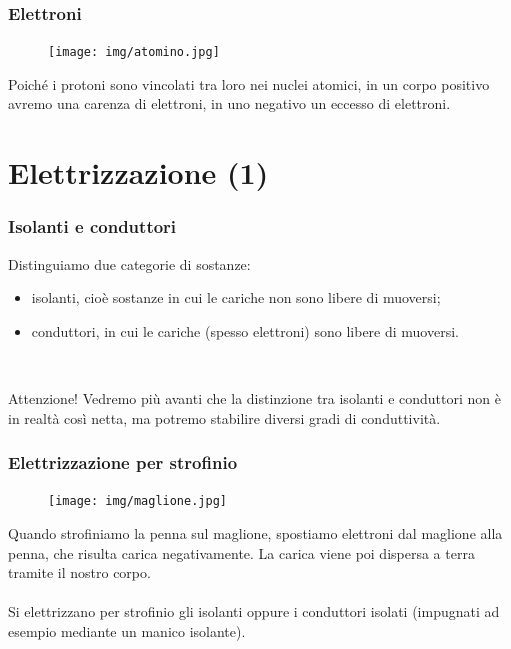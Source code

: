 \documentclass[]{beamer}
\theoremstyle{plain}
\begin{document}
\begin{frame}
\frametitle{Elettroni}
\begin{figure}
\texttt{[image: img/atomino.jpg]}
\end{figure}

Poiché i protoni sono vincolati tra loro nei nuclei atomici, in un corpo positivo avremo una carenza di elettroni, in uno negativo un eccesso di elettroni. 
\end{frame}



\section{Elettrizzazione (1)}


\begin{frame}
\frametitle{Isolanti e conduttori}
Distinguiamo due categorie di sostanze:
\begin{itemize}
  \item \alert<1>{isolanti}, cioè sostanze in cui le cariche non sono libere di muoversi;\pause
  \item \alert<2>{conduttori}, in cui le cariche (spesso elettroni) sono libere di muoversi.
\end{itemize}\pause~\\
\begin{alertblock}{Attenzione!}
  Vedremo più avanti che la distinzione tra isolanti e conduttori non è in realtà così netta, ma potremo stabilire diversi gradi di conduttività.
\end{alertblock}
\end{frame}






\begin{frame}
\frametitle{Elettrizzazione per strofinio}
\begin{figure}
\texttt{[image: img/maglione.jpg]}
\end{figure}
Quando strofiniamo la penna sul maglione, \alert{spostiamo elettroni dal maglione alla penna}, che risulta carica negativamente. La carica viene poi dispersa a terra tramite il nostro corpo.\pause\\~\\

Si elettrizzano per strofinio gli isolanti oppure i conduttori isolati (impugnati ad esempio mediante un manico isolante).
\end{frame}
\end{document}
